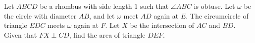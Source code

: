 Let $ABCD$ be a rhombus with side length $1$ such that $\angle ABC$ is obtuse. Let $\omega$ be the circle with diameter $AB$, and let $\omega$ meet $AD$ again at $E$. The circumcircle of triangle $EDC$ meets $\omega$ again at $F$. Let $X$ be the intersection of $AC$ and $BD$. Given that $FX\perp CD$, find the area of triangle $DEF$.
